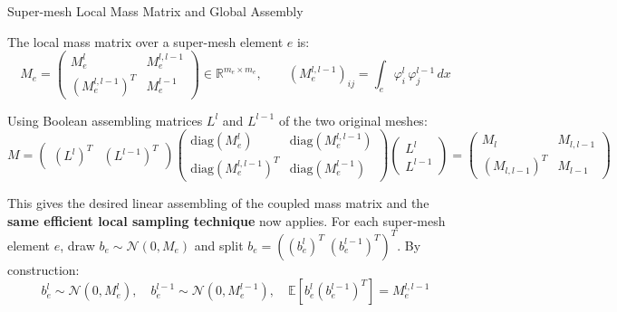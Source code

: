 \documentclass[
  english,            %
  aspectratio=169,    %
]{tumbeamer}
\begin{document}
\begin{frame}{Super-mesh Local Mass Matrix and Global Assembly}

The local mass matrix over a super-mesh element $e$ is:
\begin{equation}
  M_e = \begin{pmatrix} M_e^l & M_e^{l,l-1} \\ (M_e^{l,l-1})^T & M_e^{l-1} \end{pmatrix}
  \in \mathbb{R}^{m_e \times m_e},
  \qquad (M_e^{l,l-1})_{ij} = \int_e \varphi_i^l\,\varphi_j^{l-1}\,dx
\end{equation}

Using Boolean assembling matrices $L^l$ and $L^{l-1}$ of the two original meshes:
\begin{equation}
  M = \begin{pmatrix}(L^l)^T & (L^{l-1})^T\end{pmatrix}
  \begin{pmatrix}
    \mathrm{diag}(M_e^l) & \mathrm{diag}(M_e^{l,l-1}) \\
    \mathrm{diag}(M_e^{l,l-1})^T & \mathrm{diag}(M_e^{l-1})
  \end{pmatrix}
  \begin{pmatrix}L^l \\ L^{l-1}\end{pmatrix}
  = \begin{pmatrix} M_l & M_{l,l-1} \\ (M_{l,l-1})^T & M_{l-1} \end{pmatrix}
\end{equation}

\bigskip
This gives the desired linear assembling of the coupled mass matrix and the \textbf{same efficient local sampling technique} now applies.
For each super-mesh element $e$, draw $b_e \sim \mathcal{N}(0, M_e)$ and split
$b_e = ((b_e^l)^T\; (b_e^{l-1})^T)^T$. By construction:
\begin{equation}
  b_e^l \sim \mathcal{N}(0, M_e^l),\quad
  b_e^{l-1} \sim \mathcal{N}(0, M_e^{l-1}),\quad
  \mathbb{E}[b_e^l (b_e^{l-1})^T] = M_e^{l,l-1}
\end{equation}

\end{frame}

\end{document}
